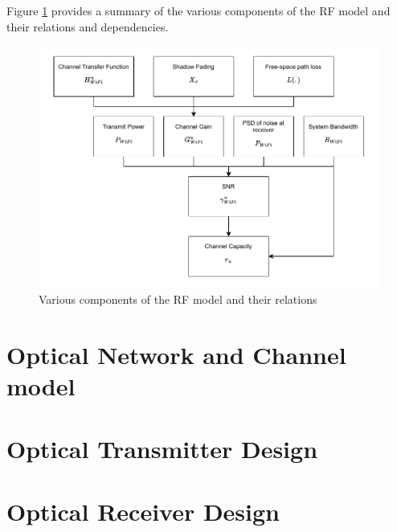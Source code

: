 Figure \ref{fig:mod-rf-model} provides a summary of the various components of the RF model and their relations and dependencies.
\begin{figure}
    \centering
    \includegraphics[width=0.75\linewidth]{Figures/RF-channel-model.drawio.pdf}
    \caption{Various components of the RF model and their relations}
    \label{fig:mod-rf-model}
\end{figure}
\section{Optical Network and Channel model}
\section{Optical Transmitter Design}
\section{Optical Receiver Design}

